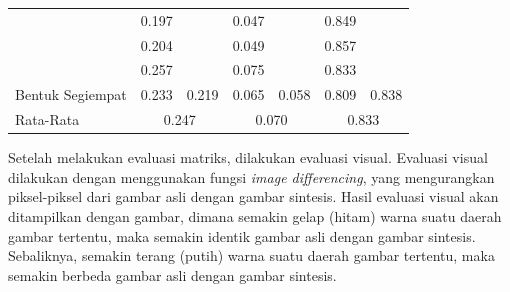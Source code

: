 \documentclass[conference]{IEEEtran}
\begin{document}
\begin{table}[]
\begin{tabular}{|l|cc|cc|cc|}
                                                      & \multicolumn{1}{c|}{\cellcolor[HTML]{FFFFFF}0.197} & \cellcolor[HTML]{FFFFFF}                         & \multicolumn{1}{c|}{\cellcolor[HTML]{FFFFFF}0.047} & \cellcolor[HTML]{FFFFFF}                           & \multicolumn{1}{c|}{\cellcolor[HTML]{FFFFFF}0.849} & \cellcolor[HTML]{FFFFFF}                        \\ \cline{2-2} \cline{4-4} \cline{6-6}
                                                      & \multicolumn{1}{c|}{\cellcolor[HTML]{FFFFFF}0.204} & \cellcolor[HTML]{FFFFFF}                         & \multicolumn{1}{c|}{\cellcolor[HTML]{FFFFFF}0.049}  & \cellcolor[HTML]{FFFFFF}                           & \multicolumn{1}{c|}{\cellcolor[HTML]{FFFFFF}0.857} & \cellcolor[HTML]{FFFFFF}                        \\ \cline{2-2} \cline{4-4} \cline{6-6}
                                                      & \multicolumn{1}{c|}{\cellcolor[HTML]{FFFFFF}0.257} & \cellcolor[HTML]{FFFFFF}                         & \multicolumn{1}{c|}{\cellcolor[HTML]{FFFFFF}0.075} & \cellcolor[HTML]{FFFFFF}                           & \multicolumn{1}{c|}{\cellcolor[HTML]{FFFFFF}0.833} & \cellcolor[HTML]{FFFFFF}                        \\ \cline{2-2} \cline{4-4} \cline{6-6}
  \multirow{-5}{*}{Bentuk Segiempat}  & \multicolumn{1}{c|}{\cellcolor[HTML]{FFFFFF}0.233} & \multirow{-5}{*}{\cellcolor[HTML]{FFFFFF}0.219} & \multicolumn{1}{c|}{\cellcolor[HTML]{FFFFFF}0.065} & \multirow{-5}{*}{\cellcolor[HTML]{FFFFFF}0.058} & \multicolumn{1}{c|}{\cellcolor[HTML]{FFFFFF}0.809} & \multirow{-5}{*}{\cellcolor[HTML]{FFFFFF}0.838} \\ \hline
  Rata-Rata                                           & \multicolumn{2}{c|}{\cellcolor[HTML]{FFFFFF}0.247}                                                    & \multicolumn{2}{c|}{0.070}                                                                              & \multicolumn{2}{c|}{0.833}                                                                           \\ \hline
  \end{tabular}
\end{table}

Setelah melakukan evaluasi matriks, dilakukan evaluasi visual. 
Evaluasi visual dilakukan dengan menggunakan fungsi \emph{image differencing}, yang mengurangkan piksel-piksel dari gambar asli dengan gambar sintesis. 
Hasil evaluasi visual akan ditampilkan dengan gambar, dimana semakin gelap (hitam) warna suatu daerah gambar tertentu, maka semakin identik gambar asli dengan gambar sintesis. 
Sebaliknya, semakin terang (putih) warna suatu daerah gambar tertentu, maka semakin berbeda gambar asli dengan gambar sintesis.
\end{document}
